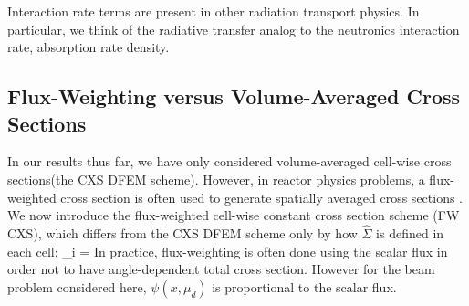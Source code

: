 Interaction rate terms are present in other radiation transport physics.
In particular, we think of the radiative transfer analog to the neutronics interaction rate, absorption rate density.


\subsection{Flux-Weighting versus Volume-Averaged Cross Sections}

In our results thus far, we have only considered volume-averaged cell-wise cross sections(the CXS DFEM scheme).
However, in reactor physics problems, a flux-weighted cross section is often used to generate spatially averaged cross sections \cite{bell_glasstone}.
We now introduce the flux-weighted cell-wise constant cross section scheme (FW CXS), which differs from the CXS DFEM scheme only by how $\hat{\Sigma}$ is defined in each cell: 
\benum
\hat{\Sigma}_i =  \pep
\label{eq:fw_cxs}
\eenum
In practice, flux-weighting is often done using the scalar flux in order not to have angle-dependent total cross section.  However for the beam problem considered here, $\psi(x,\mu_d)$ is proportional to the scalar flux.

